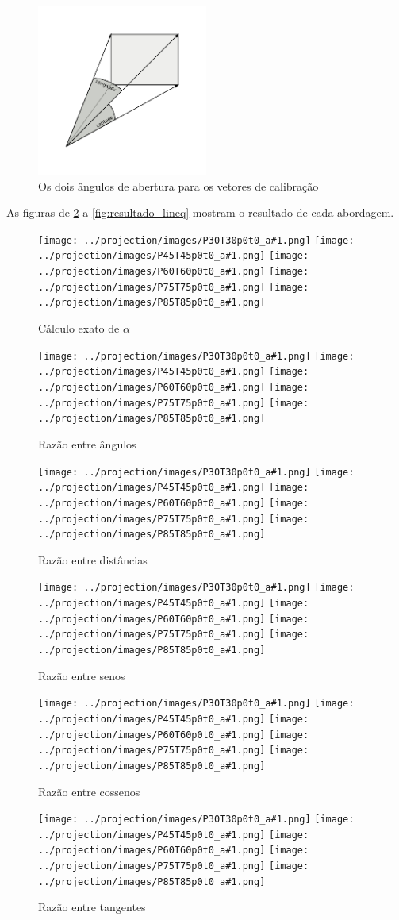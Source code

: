 \documentclass[brazil,pagestart=firstchapter]{abnt}
\newcommand*{\resultadoimagens}[1]{
	\texttt{[image: ../projection/images/P30T30p0t0\_a\#1.png]}
	\texttt{[image: ../projection/images/P45T45p0t0\_a\#1.png]}
	\texttt{[image: ../projection/images/P60T60p0t0\_a\#1.png]}
	\texttt{[image: ../projection/images/P75T75p0t0\_a\#1.png]}
	\texttt{[image: ../projection/images/P85T85p0t0\_a\#1.png]}
}
\begin{document}
\begin{figure}[h]
\centering
\includegraphics[width=0.5\textwidth]{img/latitude_longitude.pdf}
\caption{Os dois ângulos de abertura para os vetores de calibração}
\label{fig:latitude_longitude}
\end{figure}

As figuras de \ref{fig:resultado_exact} a \ref{fig:resultado_lineq} mostram
o resultado de cada abordagem.

\begin{figure}
\centering
\resultadoimagens{12}
\caption{Cálculo exato de $\alpha$}
\label{fig:resultado_exact}
\end{figure}

\begin{figure}
\centering
\resultadoimagens{7}
\caption{Razão entre ângulos}
\label{fig:resultado_angulo}
\end{figure}

\begin{figure}
\centering
\resultadoimagens{11}
\caption{Razão entre distâncias}
\label{fig:resultado_dist}
\end{figure}

\begin{figure}
\centering
\resultadoimagens{9}
\caption{Razão entre senos}
\label{fig:resultado_sin}
\end{figure}


\begin{figure}
\centering
\resultadoimagens{8}
\caption{Razão entre cossenos}
\label{fig:resultado_cos}
\end{figure}

\begin{figure}
\centering
\resultadoimagens{10}
\caption{Razão entre tangentes}
\label{fig:resultado_tan}
\end{figure}
\end{document}
